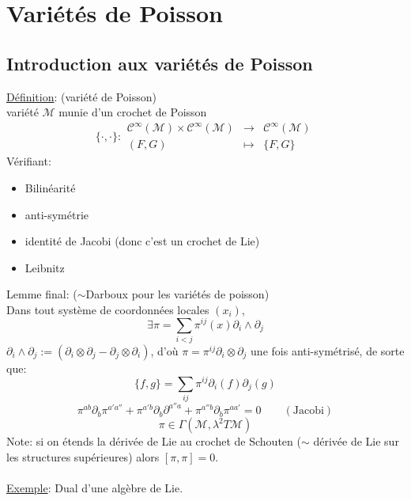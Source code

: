 \documentclass[a4paper,11pt]{article}
\begin{document}
\section{Variétés de Poisson}
\subsection{Introduction aux variétés de Poisson}
\underline{Définition}: (variété de Poisson)\\
variété $\mathcal{M}$ munie d'un crochet de Poisson
$$\{\cdot,\cdot\}: \begin{matrix}
\mathcal{C}^\infty(\mathcal{M})\times\mathcal{C}^\infty(\mathcal{M}) & \to & \mathcal{C}^\infty(\mathcal{M})\\
(F,G) & \mapsto & \{F,G\}
\end{matrix}$$
Vérifiant:
\begin{itemize}
\item Bilinéarité
\item anti-symétrie
\item identité de Jacobi (donc c'est un crochet de Lie)
\item Leibnitz
\end{itemize}

\noindent Lemme final: ($\sim$Darboux pour les variétés de poisson)\\
Dans tout système de coordonnées locales $(x_i)$,
$$\exists \pi = \sum_{i<j} \pi^{ij}(x) \partial_i \wedge\partial_j$$
$\partial_i\wedge\partial_j:=(\partial_i\otimes\partial_j-\partial_j\otimes\partial_i)$, d'où $\pi = \pi^{ij}\partial_i\otimes\partial_j$ une fois anti-symétrisé, de sorte que:
$$\{f,g\} = \sum_{ij}\pi^{ij} \partial_i (f) \partial_j (g)$$
$$\pi^{ab}\partial_b\pi^{a'a''} + \pi^{a'b}\partial_b \partial^{a''a}+\pi^{a''b}\partial_b\pi^{aa'}=0 \quad \quad(\mathrm{Jacobi})$$
$$\pi \in \Gamma(\mathcal{M},\lambda^2 T\mathcal{M})$$
Note: si on étends la dérivée de Lie au crochet de Schouten ($\sim$ dérivée de Lie sur les structures supérieures) alors $[\pi,\pi]=0$.
\\ \\
\underline{Exemple}: Dual d'une algèbre de Lie.
\end{document}
